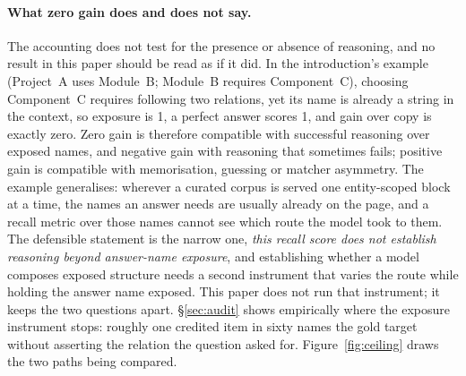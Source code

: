 \documentclass[10pt,twocolumn]{article}
\begin{document}
\paragraph{What zero gain does and does not say.} The accounting does not test for the presence or absence of reasoning, and no result in this paper should be read as if it did. In the introduction's example (Project~A uses Module~B; Module~B requires Component~C), choosing Component~C requires following two relations, yet its name is already a string in the context, so exposure is 1, a perfect answer scores 1, and gain over copy is exactly zero. Zero gain is therefore compatible with successful reasoning over exposed names, and negative gain with reasoning that sometimes fails; positive gain is compatible with memorisation, guessing or matcher asymmetry. The example generalises: wherever a curated corpus is served one entity-scoped block at a time, the names an answer needs are usually already on the page, and a recall metric over those names cannot see which route the model took to them. The defensible statement is the narrow one, \emph{this recall score does not establish reasoning beyond answer-name exposure}, and establishing whether a model composes exposed structure needs a second instrument that varies the route while holding the answer name exposed. This paper does not run that instrument; it keeps the two questions apart. \S\ref{sec:audit} shows empirically where the exposure instrument stops: roughly one credited item in sixty names the gold target without asserting the relation the question asked for. Figure~\ref{fig:ceiling} draws the two paths being compared.


\end{document}
